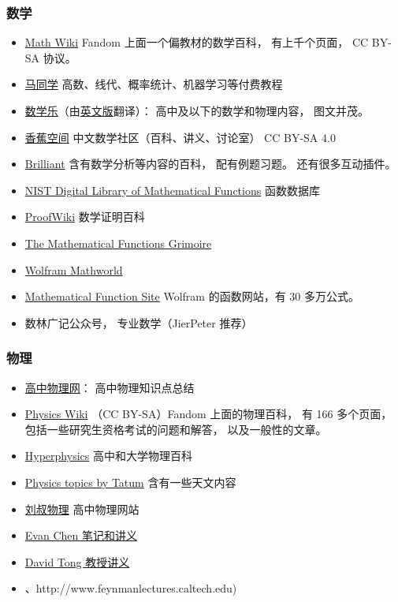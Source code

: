 \subsubsection{数学}
\begin{itemize}
\item \href{https://math.fandom.com/}{Math Wiki} Fandom 上面一个偏教材的数学百科， 有上千个页面， CC BY-SA 协议。
\item \href{https://www.matongxue.com}{马同学} 高数、线代、概率统计、机器学习等付费教程 %
\item \href{https://www.shuxuele.com}{数学乐}（由\href{https://www.mathsisfun.com}{英文版}翻译）： 高中及以下的数学和物理内容， 图文并茂。
\item \href{https://www.bananaspace.org/wiki}{香蕉空间} 中文数学社区（百科、讲义、讨论室） CC BY-SA 4.0
\item \href{https://brilliant.org}{Brilliant} 含有数学分析等内容的百科， 配有例题习题。 还有很多互动插件。
\item \href{https://dlmf.nist.gov}{NIST Digital Library of Mathematical Functions} 函数数据库
\item \href{https://proofwiki.org/wiki/Main_Page}{ProofWiki} 数学证明百科
\item \href{https://fungrim.org}{The Mathematical Functions Grimoire}
\item \href{https://mathworld.wolfram.com}{Wolfram Mathworld}
\item \href{https://functions.wolfram.com/}{Mathematical Function Site} Wolfram 的函数网站，有 30 多万公式。
\item 数林广记公众号， 专业数学（JierPeter 推荐）
\end{itemize}

\subsubsection{物理}
\begin{itemize}
\item \href{http://gaozhongwuli.com}{高中物理网}： 高中物理知识点总结
\item \href{http://www.example.com}{Physics Wiki} （CC BY-SA）Fandom 上面的物理百科， 有 166 多个页面， 包括一些研究生资格考试的问题和解答， 以及一般性的文章。
\item \href{http://hyperphysics.phy-astr.gsu.edu}{Hyperphysics} 高中和大学物理百科
\item \href{http://www.astro.uvic.ca/~tatum/index.php}{Physics topics by Tatum} 含有一些天文内容
\item \href{http://www.myliushu.com}{刘叔物理} 高中物理网站
\item \href{https://web.evanchen.cc/coursework.html}{Evan Chen 笔记和讲义}
\item \href{http://www.damtp.cam.ac.uk/user/tong/teaching.html}{David Tong 教授讲义}
\item 、http://www.feynmanlectures.caltech.edu)
\end{itemize}


